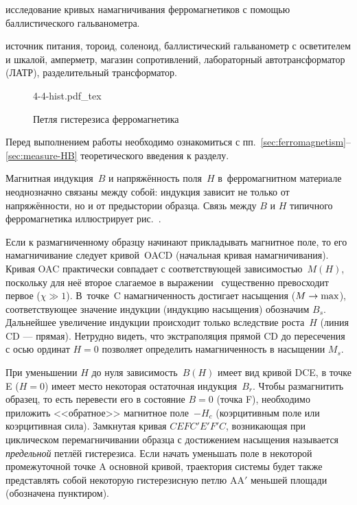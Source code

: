 
\begin{lab:aim}
	исследование кривых намагничивания ферромагнетиков с помощью баллистического
гальванометра.
\end{lab:aim}

\begin{lab:equipment}
	источник питания, тороид, соленоид, баллистический гальванометр с
осветителем и шкалой,
	амперметр, магазин сопротивлений, лабораторный автотрансформатор (ЛАТР),
разделительный трансформатор.
\end{lab:equipment}


\begin{figure}[h]
    \centering
    {4-4-hist.pdf_tex}
	\caption{Петля гистерезиса ферромагнетика}
\end{figure}

Перед выполнением работы необходимо ознакомиться с
пп.~\ref{sec:ferromagnetism}--\ref{sec:measure-HB} теоретического введения к
разделу.

Магнитная индукция~${B}$ и напряжённость поля~${H}$
в~ферромагнитном материале неоднозначно связаны между
собой: индукция зависит не только от напряжённости, но и от предыстории образца.
Связь между $B$ и $H$ типичного ферромагнетика иллюстрирует
рис.~.

Если к размагниченному образцу начинают прикладывать магнитное поле,
то его намагничивание следует кривой~OACD (начальная кривая намагничивания).
Кривая OAC практически совпадает с соответствующей зависимостью~$M(H)$,
поскольку для неё второе слагаемое в выражении~
существенно превосходит первое ($\chi\gg1$). В~точке~C намагниченность
достигает насыщения ($M\to \rm max$), соответствующее значение
индукции (индукцию насыщения) обозначим $B_s$.
Дальнейшее увеличение индукции происходит только вследствие
роста~$H$ (линия CD --- прямая). Нетрудно видеть, что экстраполяция прямой CD до пересечения
с осью ординат $H=0$ позволяет определить намагниченность в насыщении
$M_s$.

При уменьшении $H$ до нуля зависимость~$B(H)$ имеет вид
кривой DCE, в точке E ($H=0$) имеет место некоторая остаточная индукция~$B_r$.
Чтобы размагнитить образец, то есть перевести
его в состояние $B=0$ (точка F), необходимо приложить <<обратное>> магнитное поле~$-H_c$
(коэрцитивным поле или коэрцитивная сила).
Замкнутая кривая $CEFC'E'F'C$, возникающая при циклическом перемагничивании
образца с достижением насыщения
называется \emph{предельной} петлёй гистерезиса. Если начать уменьшать поле
в некоторой промежуточной точке A основной кривой, траектория
системы будет также представлять собой некоторую гистерезисную петлю AA$'$
меньшей площади (обозначена пунктиром).


